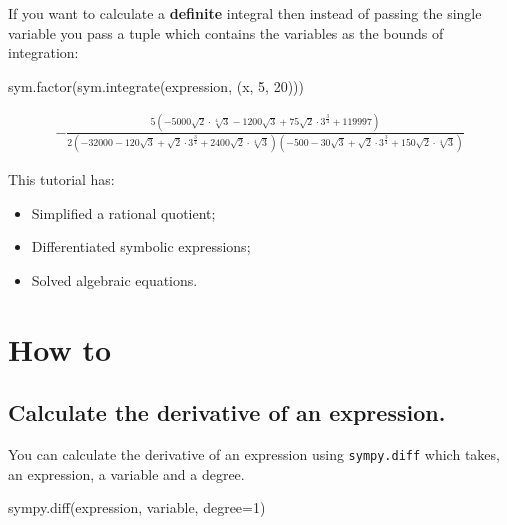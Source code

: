 If you want to calculate a \textbf{definite} integral then instead of passing the
single variable you pass a tuple which contains the variables as the
bounds of integration:




\begin{pyin}
sym.factor(sym.integrate(expression, (x, 5, 20)))
\end{pyin}




\begin{equation*}
\begin{split}\displaystyle - \frac{5 \left(- 5000 \sqrt{2} \cdot \sqrt[4]{3} - 1200 \sqrt{3} + 75 \sqrt{2} \cdot 3^{\frac{3}{4}} + 119997\right)}{2 \left(-32000 - 120 \sqrt{3} + \sqrt{2} \cdot 3^{\frac{3}{4}} + 2400 \sqrt{2} \cdot \sqrt[4]{3}\right) \left(-500 - 30 \sqrt{3} + \sqrt{2} \cdot 3^{\frac{3}{4}} + 150 \sqrt{2} \cdot \sqrt[4]{3}\right)}\end{split}
\end{equation*}



\begin{note}
This tutorial has:
\begin{itemize}

\item 
    Simplified a rational quotient;

\item 

Differentiated symbolic expressions;


\item 

Solved algebraic equations.

\end{itemize}
\end{note}




\section{How to}

\subsection{Calculate the derivative of an expression.}

You can calculate the derivative of an expression using \texttt{sympy.diff} which takes,
an expression, a variable and a degree.


\begin{api}
sympy.diff(expression, variable, degree=1)
\end{api}



